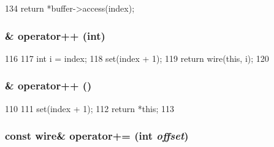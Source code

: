 \begin{DoxyCode}
134 { return *buffer->access(index); }
\end{DoxyCode}
\hypertarget{classTimeBuffer_1_1wire_a8093b8f9d4bf061e125fd37ff797e7d1}{
\subsubsection[{operator++}]{\& operator++ (int)}}
\label{classTimeBuffer_1_1wire_a8093b8f9d4bf061e125fd37ff797e7d1}



\begin{DoxyCode}
116         {
117             int i = index;
118             set(index + 1);
119             return wire(this, i);
120         }
\end{DoxyCode}
\hypertarget{classTimeBuffer_1_1wire_af6c8d85cc90a527a49cced363965a371}{
\subsubsection[{operator++}]{\& operator++ ()}}
\label{classTimeBuffer_1_1wire_af6c8d85cc90a527a49cced363965a371}



\begin{DoxyCode}
110         {
111             set(index + 1);
112             return *this;
113         }
\end{DoxyCode}
\hypertarget{classTimeBuffer_1_1wire_afd320aab0d51d48a842b52f515576553}{
\subsubsection[{operator+=}]{\setlength{\rightskip}{0pt plus 5cm}const {\bf wire}\& operator+= (int {\em offset})}}
\label{classTimeBuffer_1_1wire_afd320aab0d51d48a842b52f515576553}



